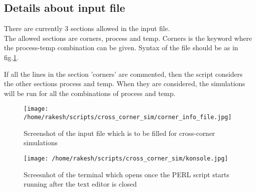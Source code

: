 \documentclass{article}
\begin{document}
\subsection{Details about input file}
There are currently 3 sections allowed in the input file. \\
The allowed sections are corners, process and temp. Corners is the keyword where the process-temp combination can be given. Syntax of the file should be as in fig.\ref{fig:input_file}. 

If all the lines in the section 'corners' are commented, then the script considers the other sections process and temp. 
When they are considered, the simulations will be run for all the combinations of process and temp. \\

\begin{figure}[htp]
\centering
\texttt{[image: /home/rakesh/scripts/cross\_corner\_sim/corner\_info\_file.jpg]}
\caption{Screenshot of the input file which is to be filled for cross-corner simulations}
\label{fig:input_file}
\end{figure}
\begin{figure}[htp]
\centering
\texttt{[image: /home/rakesh/scripts/cross\_corner\_sim/konsole.jpg]}
\caption{Screesnhot of the terminal which opens once the PERL script starts running after the text editor is closed}
\label{}
\end{figure}
\end{document}
